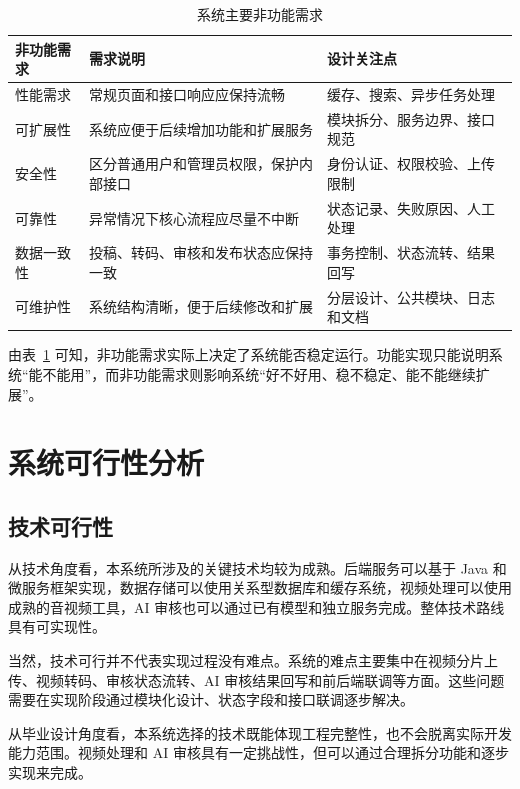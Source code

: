 \begin{table}[htbp]
  \centering
  \caption{系统主要非功能需求}
  \label{tab:non-functional-requirements}
  \begin{tabular}{p{}p{}p{}}
    \hline
    \textbf{非功能需求} & \textbf{需求说明} & \textbf{设计关注点} \\
    \hline
    性能需求 & 常规页面和接口响应应保持流畅 & 缓存、搜索、异步任务处理 \\
    可扩展性 & 系统应便于后续增加功能和扩展服务 & 模块拆分、服务边界、接口规范 \\
    安全性 & 区分普通用户和管理员权限，保护内部接口 & 身份认证、权限校验、上传限制 \\
    可靠性 & 异常情况下核心流程应尽量不中断 & 状态记录、失败原因、人工处理 \\
    数据一致性 & 投稿、转码、审核和发布状态应保持一致 & 事务控制、状态流转、结果回写 \\
    可维护性 & 系统结构清晰，便于后续修改和扩展 & 分层设计、公共模块、日志和文档 \\
    \hline
  \end{tabular}
\end{table}

由表~\ref{tab:non-functional-requirements} 可知，非功能需求实际上决定了系统能否稳定运行。功能实现只能说明系统“能不能用”，而非功能需求则影响系统“好不好用、稳不稳定、能不能继续扩展”。

\section{系统可行性分析}
\label{sec:feasibility-analysis}

\subsection{技术可行性}
\label{subsec:technical-feasibility}

从技术角度看，本系统所涉及的关键技术均较为成熟。后端服务可以基于 Java 和微服务框架实现，数据存储可以使用关系型数据库和缓存系统，视频处理可以使用成熟的音视频工具，AI 审核也可以通过已有模型和独立服务完成。整体技术路线具有可实现性。

当然，技术可行并不代表实现过程没有难点。系统的难点主要集中在视频分片上传、视频转码、审核状态流转、AI 审核结果回写和前后端联调等方面。这些问题需要在实现阶段通过模块化设计、状态字段和接口联调逐步解决。

从毕业设计角度看，本系统选择的技术既能体现工程完整性，也不会脱离实际开发能力范围。视频处理和 AI 审核具有一定挑战性，但可以通过合理拆分功能和逐步实现来完成。

